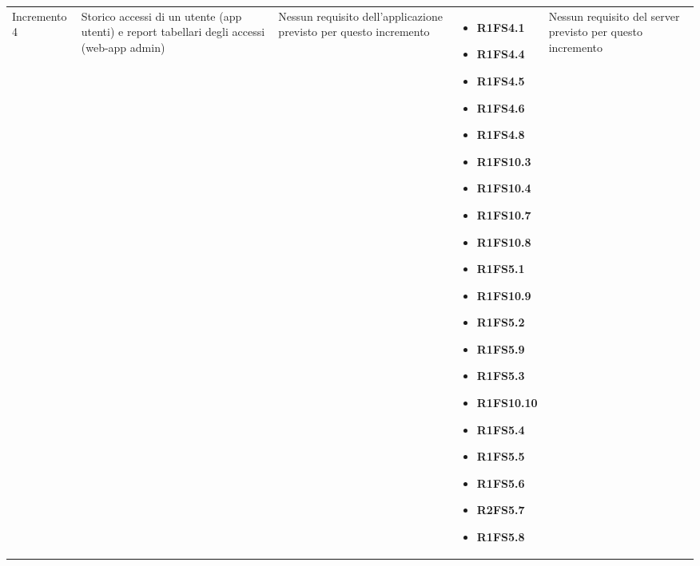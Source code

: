 {\begin{longtable}{C{2.5cm} C{3.2cm} C{2.8cm} C{2.8cm} C{2.8cm}}
Incremento 4 & Storico accessi di un utente (app utenti) e report tabellari degli accessi (web-app admin) &
    Nessun requisito dell'applicazione previsto per questo incremento
    & \begin{itemize} 
    \item[ ] \textbf{R1FS4.1}
    \item[ ] \textbf{R1FS4.4}
    \item[ ] \textbf{R1FS4.5}
    \item[ ] \textbf{R1FS4.6}
    \item[ ] \textbf{R1FS4.8}
    \item[ ] \textbf{R1FS10.3}
    \item[ ] \textbf{R1FS10.4}
    \item[ ] \textbf{R1FS10.7}
    \item[ ] \textbf{R1FS10.8}
    \item[ ] \textbf{R1FS5.1}
    \item[ ] \textbf{R1FS10.9}
    \item[ ] \textbf{R1FS5.2}
    \item[ ] \textbf{R1FS5.9}
    \item[ ] \textbf{R1FS5.3}
    \item[ ] \textbf{R1FS10.10}
    \item[ ] \textbf{R1FS5.4}
    \item[ ] \textbf{R1FS5.5}
    \item[ ] \textbf{R1FS5.6}
    \item[ ] \textbf{R2FS5.7}
    \item[ ] \textbf{R1FS5.8}
\end{itemize} & 
    Nessun requisito del server previsto per questo incremento \\


\end{longtable}}

